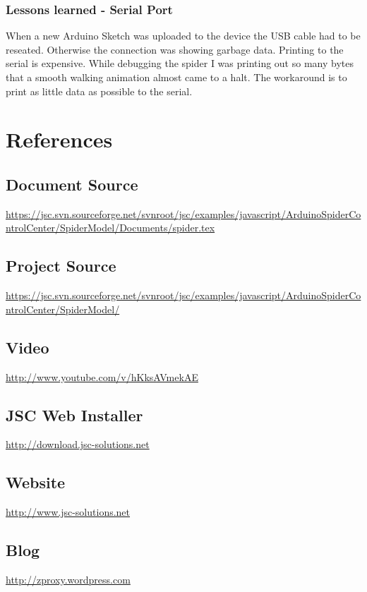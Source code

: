 \documentclass[12pt,leqno]{book}
\begin{document}
\subsection{Lessons learned - Serial Port}

When a new Arduino Sketch was uploaded to the device the USB cable had to be reseated. Otherwise the connection was showing garbage data. Printing to the serial is expensive. While debugging the spider I was printing out so many bytes that a smooth walking animation almost came to a halt. The workaround is to print as little data as possible to the serial.







\chapter{References}

\section{Document Source}

\url{https://jsc.svn.sourceforge.net/svnroot/jsc/examples/javascript/ArduinoSpiderControlCenter/SpiderModel/Documents/spider.tex}

\section{Project Source}
\url{https://jsc.svn.sourceforge.net/svnroot/jsc/examples/javascript/ArduinoSpiderControlCenter/SpiderModel/}

\section{Video}
\url{http://www.youtube.com/v/hKksAVmekAE}

\section{JSC Web Installer}
\url{http://download.jsc-solutions.net}

\section{Website}
\url{http://www.jsc-solutions.net}

\section{Blog}
\url{http://zproxy.wordpress.com}
\end{document}
